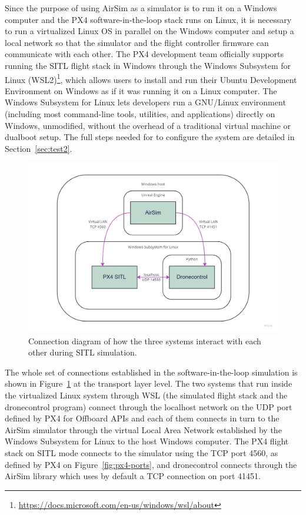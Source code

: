 Since the purpose of using AirSim as a simulator is to run it on a Windows computer and the PX4 software-in-the-loop stack runs on Linux, it is necessary to run a virtualized Linux OS in parallel on the Windows computer and setup a local network so that the simulator and the flight controller firmware can communicate with each other.
The PX4 development team officially supports running the SITL flight stack in Windows through the Windows Subsystem for Linux (WSL2)\footnote{\url{https://docs.microsoft.com/en-us/windows/wsl/about}}, which allows users to install and run their Ubuntu Development Environment on Windows as if it was running it on a Linux computer.
The Windows Subsystem for Linux lets developers run a GNU/Linux environment (including most command-line tools, utilities, and applications) directly on Windows, unmodified, without the overhead of a traditional virtual machine or dualboot setup.
The full steps needed for to configure the system are detailed in Section~\ref{sec:test2}.

\begin{figure}
  \centering
  \includegraphics[width=\textwidth,keepaspectratio]{img/sitl-connections.jpg}
  \caption{Connection diagram of how the three systems interact with each other during SITL simulation.}\label{fig:sitl-connections}
\end{figure}
The whole set of connections established in the software-in-the-loop simulation is shown in Figure~\ref{fig:sitl-connections} at the transport layer level. The two systems that run inside the virtualized Linux system through WSL (the simulated flight stack and the dronecontrol program) connect through the localhost network on the UDP port defined by PX4 for Offboard APIs and each of them connects in turn to the AirSim simulator through the virtual Local Area Network established by the Windows Subsystem for Linux to the host Windows computer.
The PX4 flight stack on SITL mode connects to the simulator using the TCP port 4560, as defined by PX4 on Figure~\ref{fig:px4-ports}, and dronecontrol connects through the AirSim library which uses by default a TCP connection on port 41451.

